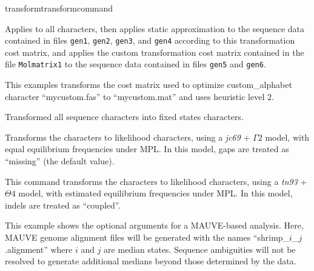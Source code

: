\begin{command}{transform}{transformcommand}
\begin{poyexamples}
            {Applies  to all characters, then applies
            static approximation to the sequence data contained in files \texttt{gen1}, \texttt{gen2},
            \texttt{gen3}, and \texttt{gen4} according to this transformation cost
            matrix, and applies the custom transformation cost matrix contained in the file
            \texttt{Molmatrix1} to the sequence data contained in files \texttt{gen5} and
            \texttt{gen6}.}
         
            {This examples transforms the cost matrix used to optimize custom\_alphabet 
            character ``mycustom.fas'' to ``mycustom.mat'' and uses heuristic level $2$.}
         
            {Transformed all sequence characters into fixed states characters.}
         
            {Transforms the characters to  likelihood characters, using a \emph{jc69} + $\Gamma 2$ model, 
            with equal equilibrium frequencies under MPL. In this model, gaps are treated as ``missing'' (the default value).}

            {This command transforms the characters to likelihood characters, using a \emph{tn93} + $\Theta 4$ model, 
            with estimated equilibrium frequencies under MPL. In this model, indels are treated as ``coupled''.}

            {This example shows the optional arguments for a MAUVE-based  analysis.
            Here, MAUVE genome alignment files will be generated with the names ``shrimp\_$i$\_$j$.alignment'' 
            where $i$ and $j$ are median states.  Sequence ambiguities will not be resolved to generate 
            additional medians beyond those determined by the data.}
        

\end{poyexamples}
\end{command}
